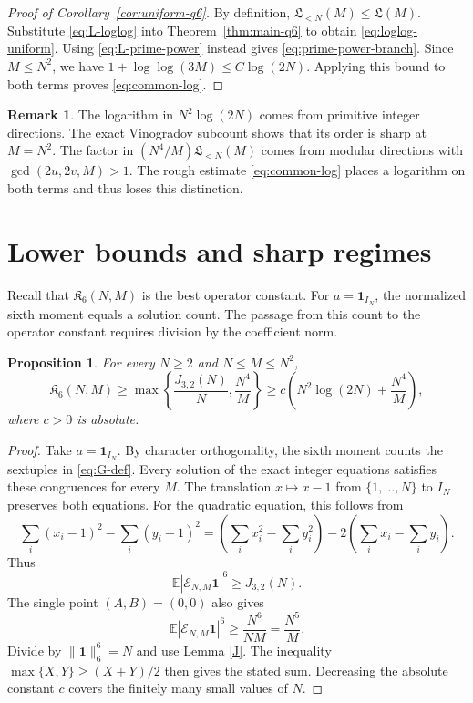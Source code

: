 \documentclass[11pt, twoside]{article}
\numberwithin{equation}{section}
\newtheorem{proposition}[theorem]{Proposition}
\theoremstyle{definition}
\newtheorem{remark}[theorem]{Remark}
\newcommand{\E}{\mathbb E}
\newcommand{\cE}{\mathcal E}
\newcommand{\ind}{\mathbf 1}
\newcommand{\Lcal}{\mathfrak L}
\newcommand{\Ksix}{\mathfrak K_6}
\begin{document}
\begin{proof}[Proof of Corollary~\ref{cor:uniform-q6}]
By definition, $\Lcal_{<N}(M)\leq\Lcal(M)$.
Substitute \eqref{eq:L-loglog} into Theorem~\ref{thm:main-q6} to obtain
\eqref{eq:loglog-uniform}.  Using \eqref{eq:L-prime-power} instead gives
\eqref{eq:prime-power-branch}.  Since $M\leq N^2$, we have
$1+\log\log(3M)\leq C\log(2N)$.  Applying this bound to both terms proves
\eqref{eq:common-log}.
\end{proof}

\begin{remark}\label{rem:two-slow-factors}
The logarithm in $N^2\log(2N)$ comes from primitive integer directions.
The exact Vinogradov subcount shows that its order is sharp at $M=N^2$.
The factor in $(N^4/M)\Lcal_{<N}(M)$ comes from modular directions with
$\gcd(2u,2v,M)>1$.  The rough estimate \eqref{eq:common-log} places a
logarithm on both terms and thus loses this distinction.
\end{remark}

\section{Lower bounds and sharp regimes}\label{sec:lower-bounds}

Recall that $\Ksix(N,M)$ is the best operator constant.
For $a=\ind_{I_N}$, the normalized sixth moment equals a solution count.
The passage from this count to the operator constant requires division by
the coefficient norm.

\begin{proposition}\label{prop:universal-lower}
For every $N\geq2$ and $N\leq M\leq N^2$,
$$
\Ksix(N,M)
\geq
\max\left\{\frac{J_{3,2}(N)}{N},\frac{N^4}{M}\right\}
\geq
c\left(N^2\log(2N)+\frac{N^4}{M}\right),
$$
where $c>0$ is absolute.
\end{proposition}

\begin{proof}
Take $a=\ind_{I_N}$.  By character orthogonality, the sixth moment counts
the sextuples in \eqref{eq:G-def}.  Every solution of the exact integer
equations satisfies these congruences for every $M$.  The translation
$x\mapsto x-1$ from $\{1,\ldots,N\}$ to $I_N$ preserves both equations.
For the quadratic equation, this follows from
$$
\sum_i(x_i-1)^2-\sum_i(y_i-1)^2
=\left(\sum_i x_i^2-\sum_i y_i^2\right)
-2\left(\sum_i x_i-\sum_i y_i\right).
$$
Thus
$$
\E|\cE_{N,M}\ind|^6\geq J_{3,2}(N).
$$
The single point $(A,B)=(0,0)$ also gives
$$
\E|\cE_{N,M}\ind|^6\geq\frac{N^6}{NM}=\frac{N^5}{M}.
$$
Divide by $\|\ind\|_6^6=N$ and use Lemma \ref{J}.
The inequality $\max\{X,Y\}\geq(X+Y)/2$ then gives the stated sum.
Decreasing the absolute constant $c$ covers the finitely many small values
of $N$.
\end{proof}
\end{document}
